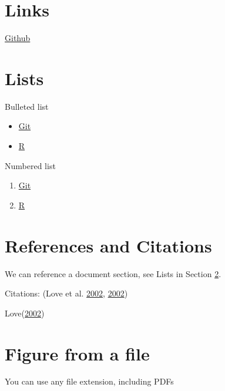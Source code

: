 \documentclass[12pt,]{article}
\begin{document}
\section{Links}\label{links}

\href{www.github.com}{Github}

\section{Lists}\label{lists}

Bulleted list

\begin{itemize}[noitemsep,nolistsep,topsep=0pt]

\item \href{https://git-scm.com/book/en/v2/Getting-Started-Installing-Git}{Git}

\item \href{https://cran.r-project.org/bin/windows/base/}{R}

\end{itemize}

Numbered list

\begin{enumerate}[noitemsep,nolistsep,topsep=0pt]

\item \href{https://git-scm.com/book/en/v2/Getting-Started-Installing-Git}{Git}

\item \href{https://cran.r-project.org/bin/windows/base/}{R} 

\end{enumerate}

\section{References and Citations}\label{references-and-citations}

We can reference a document section, see Lists in Section \ref{lists}.

Citations: (Love et al. \protect\hyperlink{ref-Love2002}{2002},
\protect\hyperlink{ref-Love2002}{2002})

Love(\protect\hyperlink{ref-Love2002}{2002})

\section{Figure from a file}\label{figure-from-a-file}

You can use any file extension, including PDFs
\end{document}
